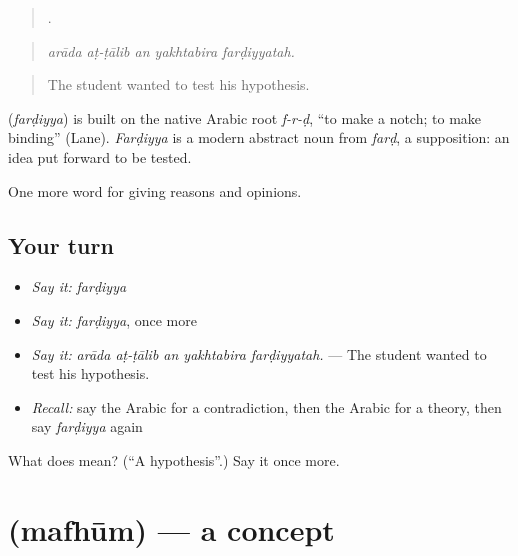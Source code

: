 \begin{quote}
    .
\end{quote}

\begin{quote}
\emph{arāda aṭ-ṭālib an yakhtabira farḍiyyatah.}
\end{quote}

\begin{quote}
The student wanted to test his hypothesis.
\end{quote}

\begin{cousinweb}
\textbf{} (\emph{farḍiyya}) is built on the native Arabic root \emph{f-r-ḍ}, \textquotedblleft{}to make a notch; to make binding\textquotedblright{} (Lane). \emph{Farḍiyya} is a modern abstract noun from \emph{farḍ}, a supposition: an idea put forward to be tested.
\end{cousinweb}

\begin{grammarlens}[title={What you've built}]
One more word for giving reasons and opinions.
\end{grammarlens}

\subsection*{Your turn}
\begin{itemize}
\raggedright
  \item \emph{Say it:} \emph{farḍiyya}
  \item \emph{Say it:} \emph{farḍiyya}, once more
  \item \emph{Say it:} \emph{arāda aṭ-ṭālib an yakhtabira farḍiyyatah.} — The student wanted to test his hypothesis.
  \item \emph{Recall:} say the Arabic for a contradiction, then the Arabic for a theory, then say \emph{farḍiyya} again
\end{itemize}

\begin{tcolorbox}[breakable,colback=teal!4,colframe=teal!35!black,title={Before you move on}]
What does  mean? (\textquotedblleft{}A hypothesis\textquotedblright{}.) Say it once more.
\end{tcolorbox}
\section[\texorpdfstring{\ar{مفهوم} (mafhūm)}{مفهوم (mafhūm)}]{ (mafhūm) — a concept}

